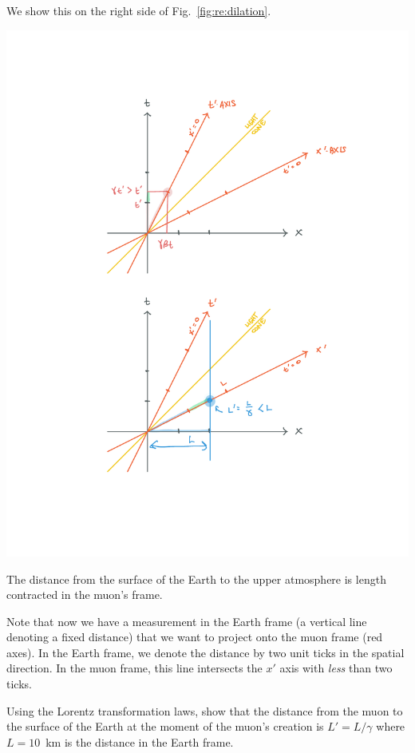 \documentclass[12pt, oneside]{report}    %
\begin{document}
We show this on the right side of Fig.~\ref{fig:re:dilation}.
\begin{marginfigure}
\includegraphics[width=\textwidth]{figures/rel_len_contractino.pdf}
\caption{The distance from the surface of the Earth to the upper atmosphere is length contracted in the muon's frame.
    \label{fig:re:dilation}
}
\end{marginfigure}
Note that now we have a measurement in the Earth frame (a vertical line denoting a fixed distance) that we want to project onto the muon frame (red axes). In the Earth frame, we denote the distance by two unit ticks in the spatial direction. In the muon frame, this line intersects the $x'$ axis with \emph{less} than two ticks.

\begin{exercise}
Using the Lorentz transformation laws, show that the distance from the muon to the surface of the Earth at the moment of the muon's creation is $L'=L/\gamma$ where $L=10$~km is the distance in the Earth frame. 
\end{exercise}
\end{document}
